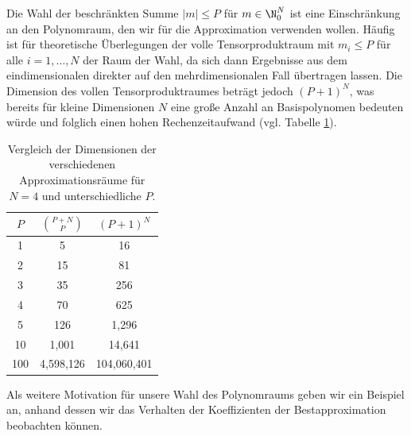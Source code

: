 \begin{mathbem}
Die Wahl der beschränkten Summe $|m|\le P$ für $m\in\N_0^N$ ist eine Einschränkung an den Polynomraum, den wir für die Approximation verwenden wollen. Häufig ist für theoretische Überlegungen der volle Tensorproduktraum mit $m_i\le P$ für alle $i=1,\dots,N$ der Raum der Wahl, da sich dann Ergebnisse aus dem eindimensionalen direkter auf den mehrdimensionalen Fall übertragen lassen. Die Dimension des vollen Tensorproduktraumes beträgt jedoch $(P+1)^N$, was bereits für kleine Dimensionen $N$ eine große Anzahl an Basispolynomen bedeuten würde und folglich einen hohen Rechenzeitaufwand (vgl. Tabelle \ref{table:poly_space_dim}).
\begin{table}
\centering
\begin{tabular}{c|cc}
$P$ & $\binom{P+N}{P}$ & $(P+1)^N$\\
\hline
1  &  5  &  16 \\
2  &  15  &  81 \\
3  &  35  &  256 \\
4  &  70  &  625 \\
5  &  126  &  1,296 \\
10  &  1,001  &  14,641 \\
100  &  4,598,126  &  104,060,401 
\end{tabular}
\caption{Vergleich der Dimensionen der verschiedenen Approximationsräume für $N=4$ und unterschiedliche $P$.}
\label{table:poly_space_dim}
\end{table}
\end{mathbem}
Als weitere Motivation für unsere Wahl des Polynomraums geben wir ein Beispiel an, anhand dessen wir das Verhalten der Koeffizienten der Bestapproximation beobachten können.
